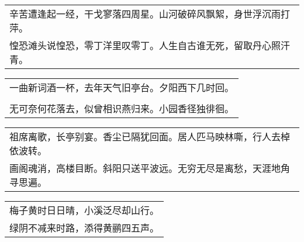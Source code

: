 \nopagebreak%
\nopagebreak%
\noindent\begin{minipage}{\linewidth}
  \vskip-3pt\begin{table}[H]
    \centering
    \begin{tabular}{@{}l@{}}
辛苦遭逢起一经，干戈寥落四周星。山河破碎风飘絮，身世浮沉雨打萍。\\
惶恐滩头说惶恐，零丁洋里叹零丁。人生自古谁无死，留取丹心照汗青。
    \end{tabular}
  \end{table}
\end{minipage}
\vspace{1cm}


\nopagebreak%
\nopagebreak%
\noindent\begin{minipage}{\linewidth}
  \vskip-3pt\begin{table}[H]
    \centering
    \begin{tabular}{@{}l@{}}
一曲新词酒一杯，去年天气旧亭台。夕阳西下几时回。\\
\\
无可奈何花落去，似曾相识燕归来。小园香径独徘徊。
    \end{tabular}
  \end{table}
\end{minipage}
\vspace{1cm}


\nopagebreak%
\nopagebreak%
\noindent\begin{minipage}{\linewidth}
  \vskip-3pt\begin{table}[H]
    \centering
    \begin{tabular}{@{}l@{}}
祖席离歌，长亭别宴。香尘已隔犹回面。居人匹马映林嘶，行人去棹依波转。\\
画阁魂消，高楼目断。斜阳只送平波远。无穷无尽是离愁，天涯地角寻思遍。
    \end{tabular}
  \end{table}
\end{minipage}
\vspace{1cm}


\nopagebreak%
\nopagebreak%
\noindent\begin{minipage}{\linewidth}
  \vskip-3pt\begin{table}[H]
    \centering
    \begin{tabular}{@{}l@{}}
梅子黄时日日晴，小溪泛尽却山行。\\
绿阴不减来时路，添得黄鹂四五声。
    \end{tabular}
  \end{table}
\end{minipage}
\vspace{1cm}


